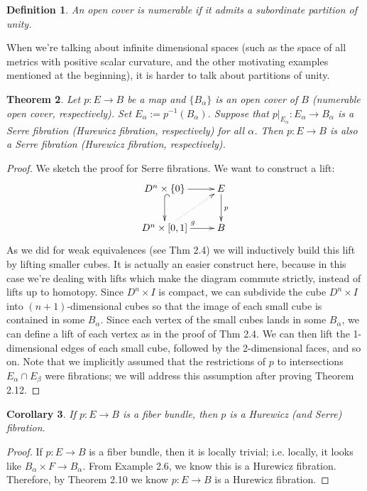 \documentclass{article}
\newtheorem{theorem}{Theorem}[section]
\newtheorem{corollary}[theorem]{Corollary}
\newtheorem{definition}[theorem]{Definition}
\newtheorem{proposed work}[theorem]{Proposed Work}
\newcommand{\xymat}[1]{\begin{align*}\xymatrix{ #1}\end{align*}}
\begin{document}
\begin{definition}
An open cover is numerable if it admits a subordinate partition of unity.
\end{definition}

When we're talking about infinite dimensional spaces (such as the space of all metrics with positive scalar curvature, and the other motivating examples mentioned at the beginning), it is harder to talk about partitions of unity. 


\begin{theorem}
Let $p:E\to B$ be a map and $\lbrace B_\alpha\rbrace$ is an open cover of $B$ (numerable open cover, respectively). Set $E_\alpha:=p^{-1}(B_\alpha)$. Suppose that $p|_{E_\alpha} : E_\alpha \to B_\alpha$ is a Serre fibration (Hurewicz fibration, respectively) for all $\alpha$. Then $p:E\to B$ is also a Serre fibration (Hurewicz fibration, respectively). 
\end{theorem}

\begin{proof}
We sketch the proof for Serre fibrations. We want to construct a lift: 
\xymat{D^n\times \lbrace 0\rbrace \ar[r] \ar@{^{(}->}[d] & E \ar[d]^p \\ D^n\times [0,1] \ar[r]^g \ar@{.>}[ur] & B}
As we did for weak equivalences (see Thm 2.4) we will inductively build this lift by lifting smaller cubes. It is actually an easier construct here, because in this case we're dealing with lifts which make the diagram commute strictly, instead of lifts up to homotopy. Since $D^n \times I$ is compact, we can subdivide the cube $D^n \times I$ into $(n+1)$-dimensional cubes so that the image of each small cube is contained in some $B_\alpha$. Since each vertex of the small cubes lands in some $B_\alpha$, we can define a lift of each vertex as in the proof of Thm 2.4. We can then lift the 1-dimensional edges of each small cube, followed by the 2-dimensional faces, and so on. Note that we implicitly assumed that the restrictions of $p$ to intersections $E_\alpha \cap E_\beta$ were fibrations; we will address this assumption after proving Theorem 2.12.
\end{proof}

\begin{corollary}
If $p:E\to B$ is a fiber bundle, then $p$ is a Hurewicz (and Serre) fibration.
\end{corollary}
\begin{proof}
If $p:E\to B$ is a fiber bundle, then it is locally trivial; i.e. locally, it looks like $B_\alpha\times F\to B_\alpha$. From Example 2.6, we know this is a Hurewicz fibration. Therefore, by Theorem 2.10 we know $p:E\to B$ is a Hurewicz fibration.
\end{proof}
\end{document}
